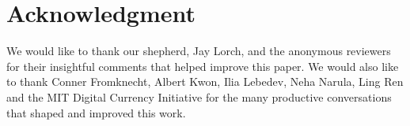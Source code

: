 \section*{Acknowledgment}
We would like to thank our shepherd, Jay Lorch, and the anonymous reviewers for their insightful comments that helped improve this paper.
We would also like to thank Conner Fromknecht, Albert Kwon, Ilia Lebedev, Neha Narula, Ling Ren and the MIT Digital Currency Initiative for the many productive conversations that shaped and improved this work.